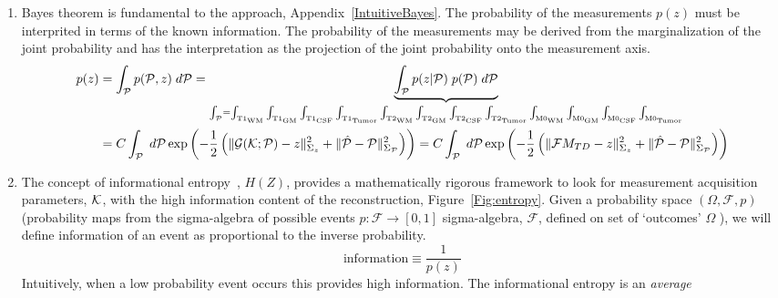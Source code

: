 \documentclass{article}         %
\theoremstyle{definition}
\theoremstyle{remark}
\begin{document}
\begin{enumerate}
  \item Bayes theorem is fundamental to the approach, Appendix~\ref{IntuitiveBayes}.
The probability of the measurements $p(z)$ must be interprited in terms of the
known information. The probability of the measurements may be derived from
the marginalization of the joint probability and has the interpretation as
the projection of the joint probability onto the measurement axis.
\[ 
\begin{split}
p(z) & = \int_{\mathcal{P}} p(\mathcal{P},z)  \; d\mathcal{P}  
       = \underbrace{
         \int_{\mathcal{P}} 
          p(z|\mathcal{P}) \; p(\mathcal{P})\; d\mathcal{P}  
          }_{
         \int_{\mathcal{P}}  =
              \int_{\text{T1}_\text{WM}     }
              \int_{\text{T1}_\text{GM}     }
              \int_{\text{T1}_\text{CSF}    }
              \int_{\text{T1}_\text{Tumor}  }
              \int_{\text{T2}_\text{WM}     }
              \int_{\text{T2}_\text{GM}     }
              \int_{\text{T2}_\text{CSF}    }
              \int_{\text{T2}_\text{Tumor}  }
              \int_{\text{M0}_\text{WM}     }
              \int_{\text{M0}_\text{GM}     }
              \int_{\text{M0}_\text{CSF}    }
              \int_{\text{M0}_\text{Tumor}  }
            }
    \\
     & = C 
          \int_{\mathcal{P}}
            \; d\mathcal{P}  
               \exp\left( - \frac{1}{2} \left(
                     \|\mathcal{G}(\mathcal{K};\mathcal{P})  - z \|^2_{\Sigma_z}
                   + \|\hat{\mathcal{P}}  - \mathcal{P} \|^2_{\Sigma_{\mathcal{P}}}
                  \right)              \right)
       = C 
          \int_{\mathcal{P}}
            \; d\mathcal{P}  
               \exp\left( - \frac{1}{2} \left(
                     \|\mathcal{F}M_{TD}  - z \|^2_{\Sigma_z}
                   + \|\hat{\mathcal{P}}  - \mathcal{P} \|^2_{\Sigma_{\mathcal{P}}}
                  \right)              \right)
\end{split}
\]
  \item  The concept of informational entropy~\cite{madankan2015accelerated}, $H(Z)$,
provides a mathematically rigorous framework to look for measurement acquisition
parameters, $\mathcal{K}$, with the high information content of the reconstruction, Figure~\ref{Fig:entropy}.
Given a probability space 
$(\Omega, \mathcal{F},p)$ (probability maps from the
sigma-algebra of possible events $p:\mathcal{F}\rightarrow [0,1]$
sigma-algebra, $\mathcal{F}$, defined on set of `outcomes' $\Omega$
\cite{durrett2010probability}),
we will define information of an event  as
proportional to the inverse probability.
\[
\text{information} \equiv  \frac{1}{p(z)}
\]
Intuitively, when a low probability event occurs this provides high
information.
The informational entropy is an \textit{average}

\end{enumerate}
\end{document}
